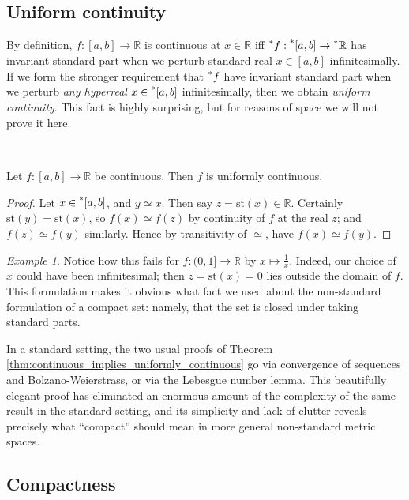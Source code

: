 \documentclass[11pt]{amsart}
\theoremstyle{remark}
\newtheorem*{example}{Example}
\newcommand{\st}{\mathrm{st}}
\newcommand{\hyp}[1][\mathbb{R}]{\prescript{*}{}{#1}}
\newcommand{\near}{\simeq}
\begin{document}
\subsection{Uniform continuity} \label{sec:uniform} By definition, $f: [a, b] \to \mathbb{R}$ is continuous at $x \in \mathbb{R}$ iff $\hyp[f] : \hyp[[]a, b] \to \hyp$ has invariant standard part when we perturb standard-real $x \in [a,b]$ infinitesimally.
If we form the stronger requirement that $\hyp[f]$ have invariant standard part when we perturb \emph{any hyperreal} $x \in \hyp[[]a, b]$ infinitesimally, then we obtain \emph{uniform continuity}.
This fact is highly surprising, but for reasons of space we will not prove it here.

\

\begin{thm} \label{thm:continuous_implies_uniformly_continuous} Let $f: [a,b] \to \mathbb{R}$ be continuous. Then $f$ is uniformly continuous.
\end{thm}
\begin{proof}
Let $x \in \hyp[[]a, b]$, and $y \near x$. Then say $z = \st(x) \in \mathbb{R}$.
Certainly $\st(y) = \st(x)$, so $f(x) \near f(z)$ by continuity of $f$ at the real $z$; and $f(z) \near f(y)$ similarly.
Hence by transitivity of $\near$, have $f(x) \near f(y)$.
\end{proof}

\begin{example}
Notice how this fails for $f: (0, 1] \to \mathbb{R}$ by $x \mapsto \frac{1}{x}$.
Indeed, our choice of $x$ could have been infinitesimal; then $z = \st(x) = 0$ lies outside the domain of $f$.
This formulation makes it obvious what fact we used about the non-standard formulation of a compact set: namely, that the set is closed under taking standard parts.
\end{example}

In a standard setting, the two usual proofs of Theorem \ref{thm:continuous_implies_uniformly_continuous} go via convergence of sequences and Bolzano-Weierstrass, or via the Lebesgue number lemma.
This beautifully elegant proof has eliminated an enormous amount of the complexity of the same result in the standard setting, and its simplicity and lack of clutter reveals precisely what ``compact'' should mean in more general non-standard metric spaces.

\subsection{Compactness}
\end{document}
